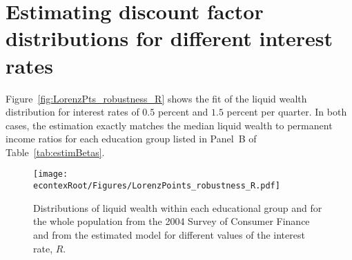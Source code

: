 \documentclass[\econtexRoot/HAFiscal]{subfiles}
\begin{document}

\hypertarget{Appendices}{} %

\section{Estimating discount factor distributions for different interest rates}
\notinsubfile{\label{app:DF_R}}

Figure~\ref{fig:LorenzPts_robustness_R} shows the fit of the liquid wealth distribution for interest rates of $0.5$ percent and $1.5$ percent per quarter. In both cases, the estimation exactly matches the median liquid wealth to permanent income ratios for each education group listed in Panel~B of Table~\ref{tab:estimBetas}. 


\begin{figure}[th]
	\begin{center}
		\texttt{[image: \\econtexRoot/Figures/LorenzPoints\_robustness\_R.pdf]}
		\caption{Distributions of liquid wealth within each educational group and for the whole population from the 2004 Survey of Consumer Finance and from the estimated model for different values of the interest rate, $R$.}
		\notinsubfile{\label{fig:LorenzPts_robustness_R}}
	\end{center}
\end{figure}
\end{document}
